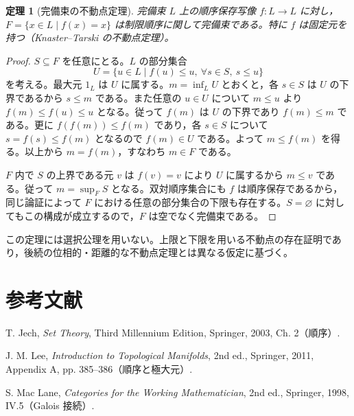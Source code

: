 \documentclass[a5paper,10pt,dvipdfmx]{jsarticle}
\theoremstyle{definition}
\theoremstyle{plain}
\newtheorem{thm}[ruledef]{定理}
\begin{document}
\begin{thm}[完備束の不動点定理]\label{k96}
完備束 $L$ 上の順序保存写像 $f:L\to L$ に対し，$F=\{x\in L\mid f(x)=x\}$ は制限順序に関して完備束である。特に $f$ は固定元を持つ（Knaster--Tarski の不動点定理）。
\end{thm}
\begin{proof}
$S\subseteq F$ を任意にとる。$L$ の部分集合
\[
 U=\{u\in L\mid f(u)\leq u,\ \forall s\in S,\ s\leq u\}
\]
を考える。最大元 $1_L$ は $U$ に属する。$m=\inf_L U$ とおくと，各 $s\in S$ は $U$ の下界であるから $s\leq m$ である。また任意の $u\in U$ について $m\leq u$ より $f(m)\leq f(u)\leq u$ となる。従って $f(m)$ は $U$ の下界であり $f(m)\leq m$ である。更に $f(f(m))\leq f(m)$ であり，各 $s\in S$ について $s=f(s)\leq f(m)$ となるので $f(m)\in U$ である。よって $m\leq f(m)$ を得る。以上から $m=f(m)$，すなわち $m\in F$ である。

$F$ 内で $S$ の上界である元 $v$ は $f(v)=v$ により $U$ に属するから $m\leq v$ である。従って $m=\sup_F S$ となる。双対順序集合にも $f$ は順序保存であるから，同じ論証によって $F$ における任意の部分集合の下限も存在する。$S=\varnothing$ に対してもこの構成が成立するので，$F$ は空でなく完備束である。
\end{proof}
この定理には選択公理を用いない。上限と下限を用いる不動点の存在証明であり，後続の位相的・距離的な不動点定理とは異なる仮定に基づく。
\section*{参考文献}
\small
\noindent T. Jech, \textit{Set Theory}, Third Millennium Edition, Springer, 2003, Ch. 2（順序）.\par
\noindent J. M. Lee, \textit{Introduction to Topological Manifolds}, 2nd ed., Springer, 2011, Appendix A, pp. 385--386（順序と極大元）.\par
\noindent S. Mac Lane, \textit{Categories for the Working Mathematician}, 2nd ed., Springer, 1998, IV.5（Galois 接続）.
\end{document}
